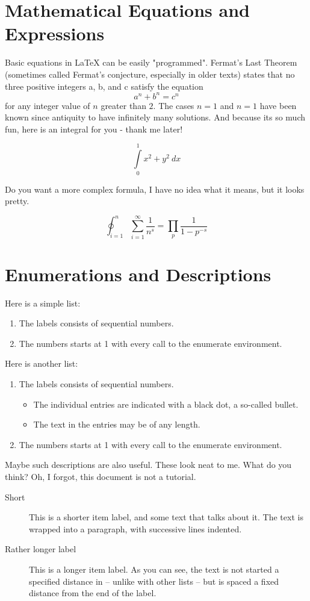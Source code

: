 \documentclass{imc-inf}
\begin{document}
\section{Mathematical Equations and Expressions}
Basic equations in  \LaTeX{} can be easily "programmed". Fermat's Last Theorem (sometimes called Fermat's conjecture, especially in older texts) states that no three positive integers a, b, and c satisfy the equation \[ a^n + b^n = c^n \] for any integer value of $n$ greater than $2$. The cases $n = 1$ and  $n = 1$  have been known since antiquity to have infinitely many solutions. And because its so much fun, here is an integral for you - thank me later!  

\[ \int\limits_0^1 x^2 + y^2 \ dx \]

Do you want a more complex formula, I have no idea what it means, but it looks pretty. 

\[\oint_{i=1}^n \sum_{i=1}^{\infty} \frac{1}{n^s} 
= \prod_p \frac{1}{1 - p^{-s}} \]


\section{Enumerations and Descriptions}
Here is a simple list: 
\begin{enumerate}
	\item The labels consists of sequential numbers.
	\item The numbers starts at 1 with every call to the enumerate environment.
\end{enumerate}

Here is another list: 

\begin{enumerate}
	\item The labels consists of sequential numbers.
	\begin{itemize}
		\item The individual entries are indicated with a black dot, a so-called bullet.
		\item The text in the entries may be of any length.
	\end{itemize}
	\item The numbers starts at 1 with every call to the enumerate environment.
\end{enumerate}

Maybe such descriptions are also useful. These look neat to me. What do you think? Oh, I forgot, this document is not a tutorial. 
\begin{description}
	\item[Short] This is a shorter item label, and some text that talks
	about it. The text is wrapped into a paragraph, with successive
	lines indented.
	\item[Rather longer label] This is a longer item label.  As you can
	see, the text is not started a specified distance in -- unlike
	with other lists -- but is spaced a fixed distance from the end
	of the label.
\end{description}
\end{document}
